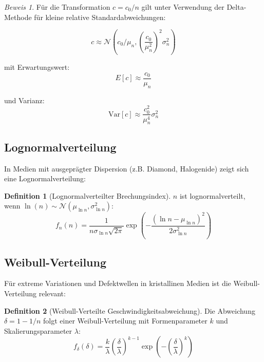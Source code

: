 \documentclass[12pt,a4paper,oneside]{article}
\theoremstyle{definition}
\newtheorem{definition}{Definition}[section]
\theoremstyle{remark}
\newtheorem*{beweis}{Beweis}
\newcommand{\cLight}{c}
\newcommand{\refIndex}{n}
\begin{document}
\begin{beweis}
Für die Transformation $\cLight = \cLight_0 / \refIndex$ gilt unter Verwendung der Delta-Methode für kleine relative Standardabweichungen:

\begin{equation}
    \cLight \approx \mathcal{N}\left(\cLight_0 / \mu_n, \left(\frac{\cLight_0}{\mu_n^2}\right)^2 \sigma_n^2\right)
\end{equation}

mit Erwartungswert:
\begin{equation}
    E[\cLight] \approx \frac{\cLight_0}{\mu_n}
\end{equation}

und Varianz:
\begin{equation}
    \text{Var}[\cLight] \approx \frac{\cLight_0^2}{\mu_n^4} \sigma_n^2
\end{equation}
\end{beweis}

\subsection{Lognormalverteilung}

In Medien mit ausgeprägter Dispersion (z.B. Diamond, Halogenide) zeigt sich eine Lognormalverteilung:

\begin{definition}[Lognormalverteilter Brechungsindex]
$\refIndex$ ist lognormalverteilt, wenn $\ln(\refIndex) \sim \mathcal{N}(\mu_{\ln n}, \sigma_{\ln n}^2)$:
\begin{equation}
    f_{\refIndex}(n) = \frac{1}{n \sigma_{\ln n} \sqrt{2\pi}} \exp\left(-\frac{(\ln n - \mu_{\ln n})^2}{2\sigma_{\ln n}^2}\right)
\end{equation}
\end{definition}

\subsection{Weibull-Verteilung}

Für extreme Variationen und Defektwellen in kristallinen Medien ist die Weibull-Verteilung relevant:

\begin{definition}[Weibull-Verteilte Geschwindigkeitsabweichung]
Die Abweichung $\delta = 1 - 1/\refIndex$ folgt einer Weibull-Verteilung mit Formenparameter $k$ und Skalierungsparameter $\lambda$:
\begin{equation}
    f_{\delta}(\delta) = \frac{k}{\lambda}\left(\frac{\delta}{\lambda}\right)^{k-1} \exp\left(-\left(\frac{\delta}{\lambda}\right)^k\right)
\end{equation}
\end{definition}
\end{document}
